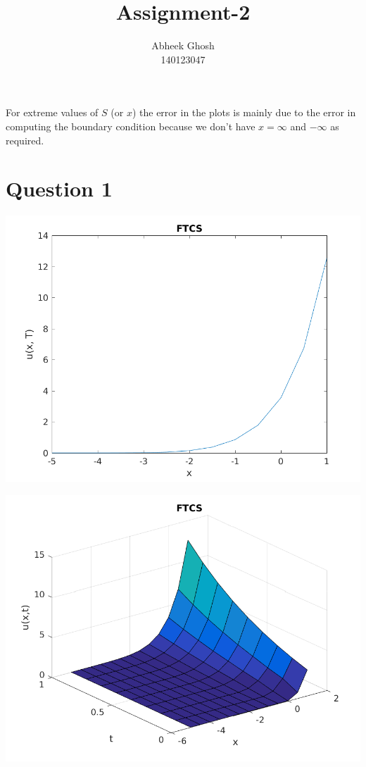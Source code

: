 \documentclass{article}
\begin{document}
	\title{\textbf{Assignment-2}}
	\author{Abheek Ghosh \\ 
		140123047 }
	
	\maketitle
	
For extreme values of $S$ (or $x$) the error in the plots is mainly due to the error in computing the boundary condition because we don't have $x = \infty$ and $-\infty$ as required.

\section{Question 1}

\includegraphics{"q1_1"}
\pagebreak


\includegraphics{"q1_2"}
\pagebreak
\end{document}
